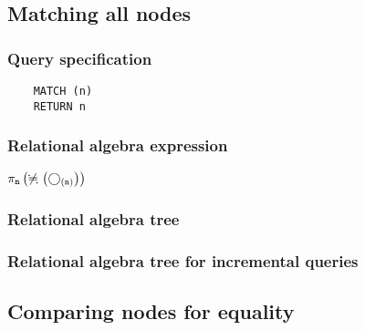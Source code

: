 	\subsection{Matching all nodes}

	\subsubsection*{Query specification}

	\begin{lstlisting}
	MATCH (n)
	RETURN n
	\end{lstlisting}


	\subsubsection*{Relational algebra expression}

	$\projection{\var{n}} \left(\alldifferent{} \left(\getvertices{n}{}\right)\right)$

	\subsubsection*{Relational algebra tree}


	\subsubsection*{Relational algebra tree for incremental queries}

	\subsection{Comparing nodes for equality}


